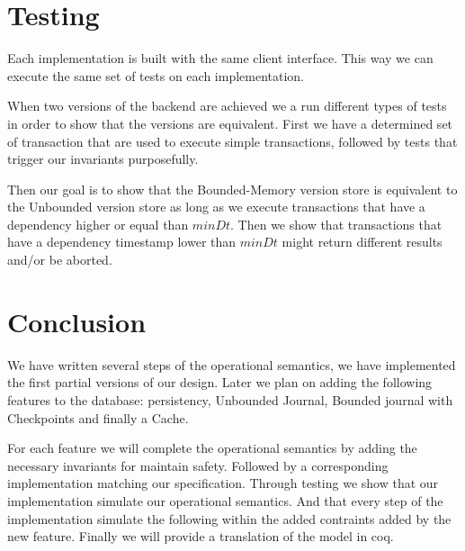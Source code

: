 \documentclass[systeme,french,english]{compas2022}
\begin{document}
\section{Testing}

Each implementation is built with the same client interface. 
This way we can execute the same set of tests on each implementation.

When two versions of the backend are achieved we a run different types of tests in order to show that the versions are equivalent.
First we have a determined set of transaction that are used to execute simple transactions, followed by tests that trigger our invariants purposefully.

Then our goal is to show that the Bounded-Memory version store is equivalent to the Unbounded version store as long as we execute transactions that have a dependency higher or equal than $\mathit{minDt}$.
Then we show that transactions that have a dependency timestamp lower than $\mathit{minDt}$ might return different results and/or be aborted.

\section{Conclusion}

We have written several steps of the operational semantics, we have implemented the first partial versions of our design.
Later we plan on adding the following features to the database: persistency, Unbounded Journal, Bounded journal with Checkpoints and finally a Cache.

For each feature we will complete the operational semantics by adding the necessary invariants for maintain safety.
Followed by a corresponding implementation matching our specification.
Through testing we show that our implementation simulate our operational semantics.
And that every step of the implementation simulate the following within the added contraints added by the new feature.
Finally we will provide a translation of the model in coq.



\end{document}
